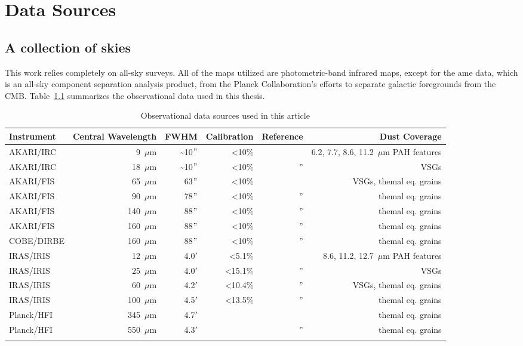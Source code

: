 
\chapter{Data Sources}
  \label{ch:datasources}

  \section{A collection of skies}
    This work relies completely on all-sky surveys. All of the maps utilized are photometric-band infrared maps, except for the \acrshort{ame} data, which is an all-sky component separation analysis product, from the Planck Collaboration's efforts to separate galactic foregrounds from the CMB. Table~\ref{tab:data} summarizes the observational data used in this thesis.
    \begin{table}[h]
      \caption{Observational data sources used in this article}
      \centering
        \begin{tabular}{lrrrrr}
        \hline\hline
        Instrument & Central Wavelength & FWHM & Calibration & Reference & Dust Coverage\\
        \hline
        AKARI/IRC & 9~$\mu$m  &  \textasciitilde{}10$"$ & \textless 10\%   & \tablefootnote{\cite{ishihara10}} & 6.2, 7.7, 8.6, 11.2~$\mu$m PAH features\\
        AKARI/IRC & 18~$\mu$m & \textasciitilde{}10$"$  & \textless 10\%     & '' & VSGs \\
        AKARI/FIS & 65~$\mu$m  & 63$"$ & \textless 10\% & \tablefootnote{\cite{doi15,takita16}}& VSGs, themal eq. grains  \\
        AKARI/FIS & 90~$\mu$m  & 78$"$ & \textless 10\%   & '' & themal eq. grains\\
        AKARI/FIS & 140~$\mu$m & 88$"$ & \textless 10\%   & '' & themal eq. grains\\
        AKARI/FIS & 160~$\mu$m & 88$"$ & \textless 10\%   & '' & themal eq. grains\\
        COBE/DIRBE & 160~$\mu$m & 88$"$ & \textless 10\%   & '' & themal eq. grains\\
        IRAS/IRIS & 12~$\mu$m   & 4.0$'$ &   \textless 5.1\%       & \tablefootnote{\cite{iris05}} & 8.6, 11.2, 12.7~$\mu$m PAH features \\
        IRAS/IRIS & 25~$\mu$m   & 4.0$'$ &    \textless 15.1\%      & '' & VSGs\\
        IRAS/IRIS & 60~$\mu$m   & 4.2$'$ &    \textless 10.4\%      & '' & VSGs, themal eq. grains\\
        IRAS/IRIS & 100~$\mu$m  & 4.5$'$ &   \textless 13.5\%       & '' & themal eq. grains \\
        Planck/HFI & 345~$\mu$m & 4.7$'$ & & \tablefootnote{\cite{hfi14viii}} & themal eq. grains \\
        Planck/HFI & 550~$\mu$m & 4.3$'$& & '' & themal eq. grains \\
        \hline
         \label{tab:data}
      \end{tabular}
    \end{table}
